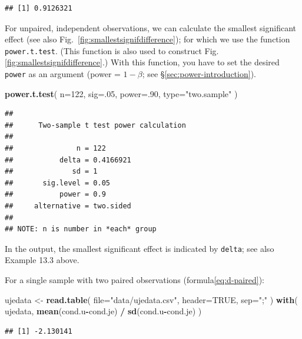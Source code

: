 \documentclass[
]{book}
\newenvironment{Shaded}{\begin{snugshade}}{\end{snugshade}}
\newcommand{\DataTypeTok}[1]{\textcolor[rgb]{0.13,0.29,0.53}{#1}}
\newcommand{\DecValTok}[1]{\textcolor[rgb]{0.00,0.00,0.81}{#1}}
\newcommand{\KeywordTok}[1]{\textcolor[rgb]{0.13,0.29,0.53}{\textbf{#1}}}
\newcommand{\NormalTok}[1]{#1}
\newcommand{\OperatorTok}[1]{\textcolor[rgb]{0.81,0.36,0.00}{\textbf{#1}}}
\newcommand{\OtherTok}[1]{\textcolor[rgb]{0.56,0.35,0.01}{#1}}
\newcommand{\StringTok}[1]{\textcolor[rgb]{0.31,0.60,0.02}{#1}}
\begin{document}
\begin{verbatim}
## [1] 0.9126321
\end{verbatim}

For unpaired, independent observations, we can calculate the smallest
significant effect (see also
Fig.~\ref{fig:smallestsignifdifference}); for which we use the function
\texttt{power.t.test}. (This function is
also used to construct Fig.\ref{fig:smallestsignifdifference}.)
With this function, you have to set the desired \texttt{power} as
an argument (power = \(1-\beta\); see
§\ref{sec:power-introduction}).

\begin{Shaded}
\begin{Highlighting}[]
\KeywordTok{power.t.test}\NormalTok{( }\DataTypeTok{n=}\DecValTok{122}\NormalTok{, }\DataTypeTok{sig=}\NormalTok{.}\DecValTok{05}\NormalTok{, }\DataTypeTok{power=}\NormalTok{.}\DecValTok{90}\NormalTok{, }\DataTypeTok{type=}\StringTok{"two.sample"}\NormalTok{ )}
\end{Highlighting}
\end{Shaded}

\begin{verbatim}
## 
##      Two-sample t test power calculation 
## 
##               n = 122
##           delta = 0.4166921
##              sd = 1
##       sig.level = 0.05
##           power = 0.9
##     alternative = two.sided
## 
## NOTE: n is number in *each* group
\end{verbatim}

In the output, the smallest significant effect is indicated by \texttt{delta}; see also
Example 13.3 above.

For a single sample with two paired observations
(formula\eqref{eq:d-paired}):

\begin{Shaded}
\begin{Highlighting}[]
\NormalTok{ujedata \textless{}{-}}\StringTok{ }\KeywordTok{read.table}\NormalTok{( }\DataTypeTok{file=}\StringTok{"data/ujedata.csv"}\NormalTok{, }\DataTypeTok{header=}\OtherTok{TRUE}\NormalTok{, }\DataTypeTok{sep=}\StringTok{";"}\NormalTok{ )}
\KeywordTok{with}\NormalTok{( ujedata, }\KeywordTok{mean}\NormalTok{(cond.u}\OperatorTok{{-}}\NormalTok{cond.je) }\OperatorTok{/}\StringTok{ }\KeywordTok{sd}\NormalTok{(cond.u}\OperatorTok{{-}}\NormalTok{cond.je) )}
\end{Highlighting}
\end{Shaded}

\begin{verbatim}
## [1] -2.130141
\end{verbatim}
\end{document}
